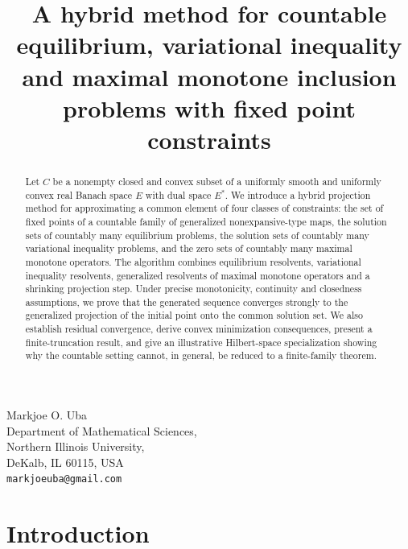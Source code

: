 \documentclass[leqno,12pt]{amsart}
\theoremstyle{definition}
\numberwithin{equation}{section}
\begin{document}
\title[Countable hybrid methods with monotone inclusions]{A hybrid method for countable equilibrium, variational inequality and maximal monotone inclusion problems with fixed point constraints}



\maketitle
\begin{center}
 Markjoe O. Uba\\
 \vspace{.1in}
Department of Mathematical Sciences,\\ 
Northern Illinois University,\\ 
DeKalb, IL 60115, USA\\
{\tt markjoeuba@gmail.com}  
\end{center}

\begin{abstract}
Let $C$ be a nonempty closed and convex subset of a uniformly smooth and uniformly convex real Banach space $E$ with dual space $E^{*}$. We introduce a hybrid projection method for approximating a common element of four classes of constraints: the set of fixed points of a countable family of generalized nonexpansive-type maps, the solution sets of countably many equilibrium problems, the solution sets of countably many variational inequality problems, and the zero sets of countably many maximal monotone operators. The algorithm combines equilibrium resolvents, variational inequality resolvents, generalized resolvents of maximal monotone operators and a shrinking projection step. Under precise monotonicity, continuity and closedness assumptions, we prove that the generated sequence converges strongly to the generalized projection of the initial point onto the common solution set. We also establish residual convergence, derive convex minimization consequences, present a finite-truncation result, and give an illustrative Hilbert-space specialization showing why the countable setting cannot, in general, be reduced to a finite-family theorem.
\end{abstract}

\section{Introduction}
\end{document}
